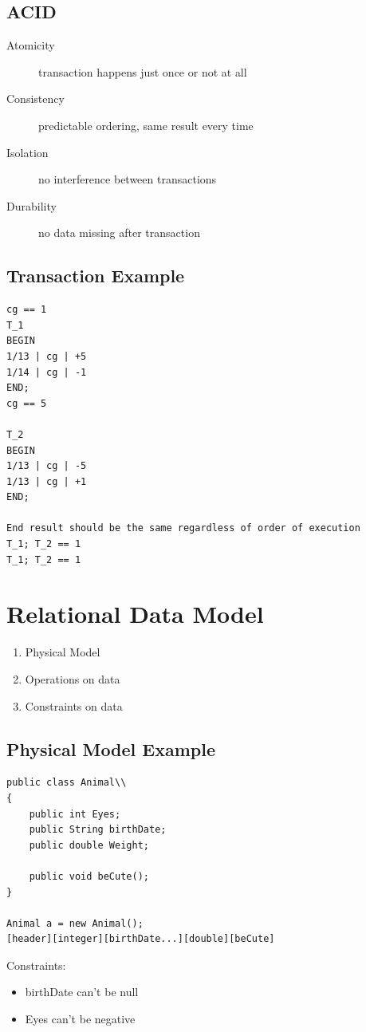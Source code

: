 \documentclass{article}
\begin{document}
\subsection{ACID}
\begin{samepage}
\begin{description}
    \item[Atomicity] transaction happens just once or not at all
    \item[Consistency] predictable ordering, same result every time
    \item[Isolation] no interference between transactions 
    \item[Durability] no data missing after transaction
\end{description}
\end{samepage}

\subsection{Transaction Example}
\begin{verbatim}
cg == 1
T_1
BEGIN
1/13 | cg | +5
1/14 | cg | -1
END;
cg == 5

T_2
BEGIN
1/13 | cg | -5
1/13 | cg | +1
END;

End result should be the same regardless of order of execution
T_1; T_2 == 1
T_1; T_2 == 1

\end{verbatim}

\section{Relational Data Model}
\begin{enumerate}
    \item{Physical Model}
    \item{Operations on data}
    \item{Constraints on data}
\end{enumerate}

\subsection{Physical Model Example}
\begin{samepage}
\begin{lstlisting}
public class Animal\\
{
    public int Eyes;
    public String birthDate;
    public double Weight;

    public void beCute();
}

Animal a = new Animal();
[header][integer][birthDate...][double][beCute]
\end{lstlisting}

Constraints:
\begin{itemize}
    \item{birthDate can't be null}
    \item{Eyes can't be negative}
\end{itemize}
\end{samepage}
\end{document}
